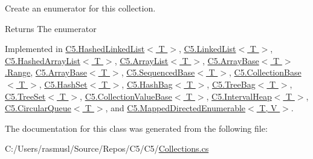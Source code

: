 Create an enumerator for this collection. 

\begin{DoxyReturn}{Returns}
The enumerator
\end{DoxyReturn}


Implemented in \hyperlink{class_c5_1_1_hashed_linked_list_ae8f40668f13afb6cb05501446a3bcc4e}{C5.\+Hashed\+Linked\+List$<$ T $>$}, \hyperlink{class_c5_1_1_linked_list_ab23965434fba5e39a15eb4c0eb3c4901}{C5.\+Linked\+List$<$ T $>$}, \hyperlink{class_c5_1_1_hashed_array_list_a0ce81bee1c45ccbc3105698a4f4692a8}{C5.\+Hashed\+Array\+List$<$ T $>$}, \hyperlink{class_c5_1_1_array_list_ae6c2dc2f2aa8c9952d3267a37e9de01a}{C5.\+Array\+List$<$ T $>$}, \hyperlink{class_c5_1_1_array_base_1_1_range_af6396c46d77d98185e8587c024dd9316}{C5.\+Array\+Base$<$ T $>$.\+Range}, \hyperlink{class_c5_1_1_array_base_a84a54c5fa039db32e27ca45c6b0cea85}{C5.\+Array\+Base$<$ T $>$}, \hyperlink{class_c5_1_1_sequenced_base_a07d117175b630fd7f87f6e61b05259dc}{C5.\+Sequenced\+Base$<$ T $>$}, \hyperlink{class_c5_1_1_collection_base_a3b4b98e2606afecb948019412c4c2533}{C5.\+Collection\+Base$<$ T $>$}, \hyperlink{class_c5_1_1_hash_set_a4c404a22695abc0f6b47bf74d3d34034}{C5.\+Hash\+Set$<$ T $>$}, \hyperlink{class_c5_1_1_hash_bag_a621d77b2f8a7c3a826aace4be1d809b2}{C5.\+Hash\+Bag$<$ T $>$}, \hyperlink{class_c5_1_1_tree_bag_a2c00797c0e29dd52efa05f219b4c9c7e}{C5.\+Tree\+Bag$<$ T $>$}, \hyperlink{class_c5_1_1_tree_set_af9dd4aece1415276e1ede1ded6904179}{C5.\+Tree\+Set$<$ T $>$}, \hyperlink{class_c5_1_1_collection_value_base_a0e8b891322ed9987a18f1a1ac87d2d4f}{C5.\+Collection\+Value\+Base$<$ T $>$}, \hyperlink{class_c5_1_1_interval_heap_a09556ba66252a46d94456587bc877561}{C5.\+Interval\+Heap$<$ T $>$}, \hyperlink{class_c5_1_1_circular_queue_ae1ab5e745ced280db9b9a175a66dc5b4}{C5.\+Circular\+Queue$<$ T $>$}, and \hyperlink{class_c5_1_1_mapped_directed_enumerable_a20cbeb4a43b678a5d3d4f6d0c3e5497b}{C5.\+Mapped\+Directed\+Enumerable$<$ T, V $>$}.



The documentation for this class was generated from the following file\+:\begin{DoxyCompactItemize}
\item 
C\+:/\+Users/rasmusl/\+Source/\+Repos/\+C5/\+C5/\hyperlink{_collections_8cs}{Collections.\+cs}\end{DoxyCompactItemize}
